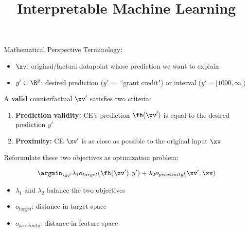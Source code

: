 \documentclass[11pt,compress,t,notes=noshow, aspectratio=169, xcolor=table, usenames,dvipsnames]{beamer}
\title{Interpretable Machine Learning}
\date{}
\begin{document}




 \newcommand{\titlefigure}{figure/counterfactuals_obj}
\newcommand{\learninggoals}{
\item Formulate CEs as optimization problem
\item Identify key objectives (proximity, sparsity)
\item Understand trade-offs in CE generation}



\begin{frame}{Mathematical Perspective}
	Terminology:
	\begin{itemize}
		\item $\xv$: original/factual datapoint whose prediction we want to explain
		\item $y' \subset \R^g$: desired prediction ($y' =$ ``grant credit") or interval ($y' = [1000, \infty[$)
	\end{itemize}
	\lz\pause
	A \textbf{valid} counterfactual $\xv'$ satisfies two criteria:
	\begin{enumerate}
    \item \textbf{Prediction validity:} CE's prediction $\fh(\xv')$ is equal to the desired prediction $y'$ 
\item \textbf{Proximity:} CE $\xv'$ is as close as possible to the original input $\xv$
	\end{enumerate}
	\lz\pause
	Reformulate these two objectives as optimization problem: %
	
$$\argmin_{\xv'} \lambda_1 o_{target}(\fh(\xv'), y') + \lambda_2 o_{proximity}(\xv', \xv)$$

	\begin{itemize}
		\item $\lambda_1$ and $\lambda_2$ balance the two objectives
          \item $o_{target}$: distance in target space %
          \item $o_{proximity}$: distance in feature space %
	\end{itemize}
\end{frame}
\end{document}
